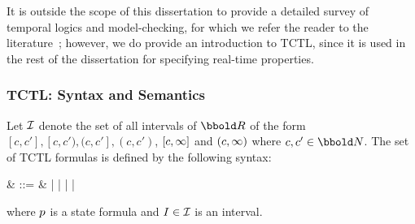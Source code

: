 {It is outside the scope of this dissertation to provide a detailed
survey of temporal logics and model-checking, for which we refer the
reader to the literature~\cite{ah:91,cgp:99,eme:90,yov:97}; however, we do
provide an introduction to TCTL, since it is used in the
rest of the dissertation for specifying real-time properties.

\subsubsection{TCTL: Syntax and Semantics}
Let $\II$ denote the set of all intervals of $\Time$ of the form
$[c,c'], [c,c'), (c,c'], (c,c')$, $[c,\infty]$ and $(c,\infty)$
where $c,c' \in \nat$.
The set of TCTL formulas is defined by the following syntax: 
\begin{syntax}
\fmla & ::= & \sfmla | \lnot \fmla | \fmla \lor \fmla | \fmla \euntil{\I} \fmla | \fmla \auntil{\I} \fmla
\end{syntax}
where $p$ is a state formula and $\I \in \II$ is an 
interval.

}
